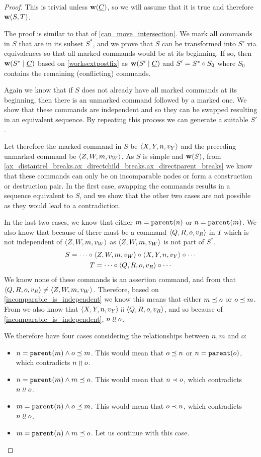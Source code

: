 \begin{proof}
This is trivial unless $\mathbf{w}({\underline{C}})$, so we will assume that it is true
and therefore $\mathbf{w}({S,T})$.

The proof is similar to that of \cref{can_move_intersection}.
We mark all commands in $S$ that are in its subset $S^*$, and
we prove that $S$ can be transformed into $S'$ via equivalences
so that all marked commands would be at its beginning.
If so, then 
$\mathbf{w}({S^*}\mathrel{|}{\underline{C}})$ 
based on \cref{worksextpostfix}
as $\mathbf{w}({S'}\mathrel{|}{\underline{C}})$ and $S'=S^*\circ S_0$ 
where $S_0$ contains the remaining (conflicting) commands.

Again we know that if $S$ does not already have all marked commands at its beginning,
then there is an unmarked command followed by a marked one.
We show that these commands are independent and so they can be swapped
resulting in an equivalent sequence.
By repeating this process we can generate a suitable $S'$.

Let therefore the marked command in $S$ be $\langle{X,Y,n,v_Y}\rangle$
and the preceding unmarked command be $\langle{Z,W,m,v_W}\rangle$.
As $S$ is simple and $\mathbf{w}({S})$, from 
\cref{ax_distantrel_breaks,ax_directchild_breaks,ax_directparent_breaks}
we know that these commands can only be on incomparable nodes or form a construction or destruction pair.
In the first case, swapping the commands results in a sequence equivalent to $S$,
and we show that the other two cases are not possible as they would lead to a contradiction.

In the last two cases, we know that either $m=\mathtt{parent}(n)$ or $n=\mathtt{parent}(m)$.
We also know that because of {\condApr} there must be 
a command $\langle{Q,R,o,v_R}\rangle$ in $T$ which is not independent of $\langle{Z,W,m,v_W}\rangle$
as $\langle{Z,W,m,v_W}\rangle$ is not part of $S^*$.
\begin{gather*}
S = \cdots\circ  \langle{Z,W,m,v_W}\rangle\circ  \langle{X,Y,n,v_Y}\rangle\circ  \cdots \\
T = \cdots\circ  \langle{Q,R,o,v_R}\rangle\circ \cdots
\end{gather*}
We know none of these commands is an assertion command, and 
from {\condDisj} that $\langle{Q,R,o,v_R}\rangle\neq\langle{Z,W,m,v_W}\rangle$.
Therefore, based on \cref{incomparable_is_independent} we know this means that
either $m\preceq o$ or $o\preceq m$.
From {\condApr} we also know that $\langle{X,Y,n,v_Y}\rangle\mathrel{\wr\wr} \langle{Q,R,o,v_R}\rangle$,
and so because of \cref{incomparable_is_independent},
$n\mathrel{\wr\wr} o$.

We therefore have four cases considering the relationships between $n,m$ and $o$:
\begin{itemize}
\item $n=\mathtt{parent}(m) \wedge o\preceq m$.
   This would mean that $o\preceq n$ or $n=\mathtt{parent}(o)$, which contradicts $n\mathrel{\wr\wr} o$.
\item $n=\mathtt{parent}(m) \wedge m\preceq o$.
   This would mean that $n\prec o$, which contradicts $n\mathrel{\wr\wr} o$.
\item $m=\mathtt{parent}(n) \wedge o\preceq m$.
   This would mean that $o\prec n$, which contradicts $n\mathrel{\wr\wr} o$.
\item $m=\mathtt{parent}(n) \wedge m\preceq o$.
   Let us continue with this case.
\end{itemize}


\end{proof}
